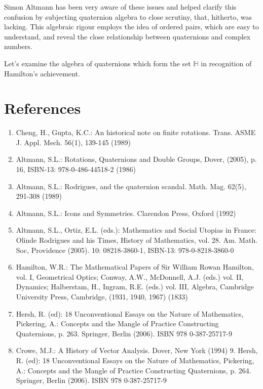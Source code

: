 \documentclass[10pt]{article}
\begin{document}
Simon Altmann has been very aware of these issues and helped clarify this confusion by subjecting quaternion algebra to close scrutiny, that, hitherto, was lacking. This algebraic rigour employs the idea of ordered pairs, which are easy to understand, and reveal the close relationship between quaternions and complex numbers.

Let's examine the algebra of quaternions which form the set $\mathbb{H}$ in recognition of Hamilton's achievement.

\section{References}
\begin{enumerate}
  \item Cheng, H., Gupta, K.C.: An historical note on finite rotations. Trans. ASME J. Appl. Mech. 56(1), 139-145 (1989)

  \item Altmann, S.L.: Rotations, Quaternions and Double Groups, Dover, (2005), p. 16, ISBN-13: 978-0-486-44518-2 (1986)

  \item Altmann, S.L.: Rodrigues, and the quaternion scandal. Math. Mag. 62(5), 291-308 (1989)

  \item Altmann, S.L.: Icons and Symmetries. Clarendon Press, Oxford (1992)

  \item Altmann, S.L., Ortiz, E.L. (eds.): Mathematics and Social Utopias in France: Olinde Rodrigues and his Times, History of Mathematics, vol. 28. Am. Math. Soc, Providence (2005). 10: 08218-3860-1, ISBN-13: 978-0-8218-3860-0

  \item Hamilton, W.R.: The Mathematical Papers of Sir William Rowan Hamilton, vol. I, Geometrical Optics; Conway, A.W., McDonnell, A.J. (eds.) vol. II, Dynamics; Halberstam, H., Ingram, R.E. (eds.) vol. III, Algebra, Cambridge University Press, Cambridge, (1931, 1940, 1967) (1833)

  \item Hersh, R. (ed): 18 Unconventional Essays on the Nature of Mathematics, Pickering, A.: Concepts and the Mangle of Practice Constructing Quaternions, p. 263. Springer, Berlin (2006). ISBN 978 0-387-25717-9

  \item Crowe, M.J.: A History of Vector Analysis. Dover, New York (1994) 9. Hersh, R. (ed): 18 Unconventional Essays on the Nature of Mathematics, Pickering, A.: Concepts and the Mangle of Practice Constructing Quaternions, p. 264. Springer, Berlin (2006). ISBN 978 0-387-25717-9


\end{enumerate}
\end{document}
